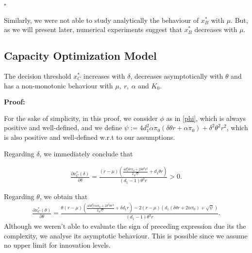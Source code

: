 \begin{flushright}
	$\square$
\end{flushright}


Similarly, we were not able to study analytically the behaviour of $x_B^*$ with $\mu$. But, as we will present later, numerical experiments suggest that $x_B^*$ decreases with $\mu$.

\subsection{Capacity Optimization Model}
\label{2_com}


\begin{prop}
	\label{2_prop2}
The decision threshold $x^*_C$ increases with $\delta$, decreases asymptotically with $\theta$ and has a non-monotonic behaviour with $\mu, \ r, \  \alpha$ and $K_0$.
\end{prop}

\textbf{Proof:}

For the sake of simplicity, in this proof, we consider $\phi$ as in \eqref{phi}, which is always positive and well-defined, and we define
$\psi:=4 d_1^2 \alpha \pi_0  (\delta  \theta  r+\alpha \pi_0 )+\delta ^2 \theta ^2 r^2$, which is also positive and well-defined w.r.t to our assumptions.

Regarding $\delta$, we immediately conclude that

\begin{align*}
\frac{\partial x^*_C ( \delta ) }{\partial \delta}= \frac{(r-\mu ) \left(\frac{4 d_1^2 \theta  r \pi_0 +2 \delta  \theta ^2 r^2}{2 \sqrt{\psi }}+d_1 \theta  r\right)}{(d_1-1) \theta ^2 r}>0.
\end{align*}

Regarding $\theta$, we obtain that
\begin{align*}
	\frac{\partial x^*_C ( \theta) }{\partial \theta}= \frac{ \theta (r-\mu ) \left(\frac{4 \delta  d_1^2 r \alpha \pi_0 +2 \delta ^2 \theta  r^2}{2 \sqrt{\psi }}+\delta  d_1 r\right)- 2 (r-\mu ) \left(d_1 (\delta  \theta  r+2 \alpha \pi_0 )+\sqrt{\psi }\right)}{(d_1-1) \theta ^3 r}.
\end{align*}
Although we weren't able to evaluate the sign of preceding expression due its the complexity, we analyse its asymptotic behaviour. This is possible since we assume no upper limit for innovation levels.

